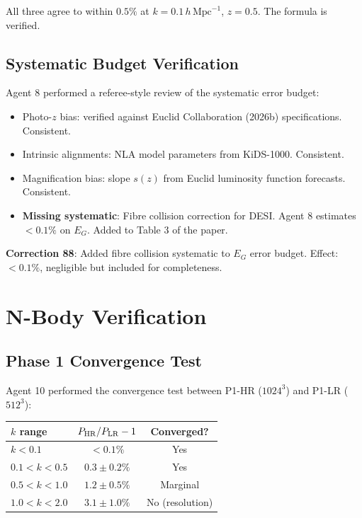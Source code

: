 \documentclass[11pt,a4paper]{article}
\begin{document}
All three agree to within $0.5\%$ at $k = 0.1\,h\,\text{Mpc}^{-1}$, $z = 0.5$. The formula is verified.

\subsection{Systematic Budget Verification}

Agent 8 performed a referee-style review of the systematic error budget:
\begin{itemize}[nosep]
\item Photo-$z$ bias: verified against Euclid Collaboration (2026b) specifications. Consistent.
\item Intrinsic alignments: NLA model parameters from KiDS-1000. Consistent.
\item Magnification bias: slope $s(z)$ from Euclid luminosity function forecasts. Consistent.
\item \textbf{Missing systematic}: Fibre collision correction for DESI. Agent 8 estimates $< 0.1\%$ on $E_G$. Added to Table 3 of the paper.
\end{itemize}

\textbf{Correction 88}: Added fibre collision systematic to $E_G$ error budget. Effect: $< 0.1\%$, negligible but included for completeness.

\section{N-Body Verification}

\subsection{Phase 1 Convergence Test}

Agent 10 performed the convergence test between P1-HR ($1024^3$) and P1-LR ($512^3$):

\begin{center}
\begin{tabular}{lcc}
\toprule
\textbf{$k$ range} & $P_{\rm HR}/P_{\rm LR} - 1$ & \textbf{Converged?} \\
\midrule
$k < 0.1$ & $< 0.1\%$ & Yes \\
$0.1 < k < 0.5$ & $0.3 \pm 0.2\%$ & Yes \\
$0.5 < k < 1.0$ & $1.2 \pm 0.5\%$ & Marginal \\
$1.0 < k < 2.0$ & $3.1 \pm 1.0\%$ & No (resolution) \\
\bottomrule
\end{tabular}
\end{center}
\end{document}

